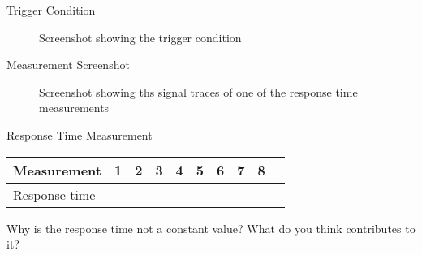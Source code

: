 \documentclass[10pt,a4paper,titlepage,oneside]{article}
\begin{document}


\begin{qa}{Trigger Condition}
	\begin{figure}[h!]
		\centering
		\dummyimage
		\caption{Screenshot showing the trigger condition}
	\end{figure}
\end{qa}

\begin{qa}{Measurement Screenshot}
	\begin{figure}[h!]
		\centering
		\dummyimage
		\caption{Screenshot showing ths signal traces of one of the response time measurements}
	\end{figure}
\end{qa}

\begin{qa}{Response Time Measurement}
\begin{center}
\begin{tabular}{|l|c|c|c|c|c|c|c|c|c|}
	\hline
	Measurement   & 1 & 2 & 3 & 4 & 5 & 6 & 7 & 8\\\hline
	Response time &   &   &   &   &   &   &   &  \\\hline
\end{tabular}
\end{center}
\end{qa}


\begin{qa}{Why is the response time not a constant value? What do you think contributes to it?}

\end{qa}
\end{document}
